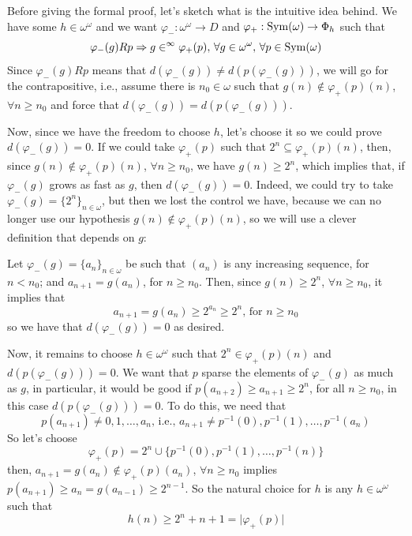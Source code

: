 \begin{sketch}
    Before giving the formal proof, let's sketch what is the intuitive idea behind. We have some $h\in\omega^\omega$ and we want $\varphi_-:\omega^\omega\to D$ and $\varphi_+:\mathrm{Sym}(\omega)\to\Phi_h$ such that
    $$\varphi_-(g)R p\Rightarrow g\in^\infty\varphi_+(p),\,\forall g\in\omega^\omega,\,\forall p\in\mathrm{Sym}(\omega)$$
    Since $\varphi_-(g)Rp$ means that $d(\varphi_-(g))\neq d(p(\varphi_-(g)))$, we will go for the contrapositive, i.e., assume there is $n_0\in\omega$ such that $g(n)\notin\varphi_+(p)(n)$, $\forall n\geq n_0$ and force that $d(\varphi_-(g))=d(p(\varphi_-(g)))$.

    Now, since we have the freedom to choose $h$, let's choose it so we could prove $d(\varphi_-(g))=0$. If we could take $\varphi_+(p)$ such that $2^n\subseteq\varphi_+(p)(n)$, then, since $g(n)\notin\varphi_+(p)(n)$, $\forall n\geq n_0$, we have $g(n)\geq 2^n$, which implies that, if $\varphi_-(g)$ grows as fast as $g$, then $d(\varphi_-(g))=0$. Indeed, we could try to take $\varphi_-(g)=\{2^n\}_{n\in\omega}$, but then we lost the control we have, because we can no longer use our hypothesis $g(n)\notin\varphi_+(p)(n)$, so we will use a clever definition that depends on $g$:
    
    Let $\varphi_-(g)=\{a_n\}_{n\in\omega}$ be such that $(a_n)$ is any increasing sequence, for $n<n_0$; and $a_{n+1}=g(a_n)$, for $n\geq n_0$. Then, since $g(n)\geq 2^n$, $\forall n\geq n_0$, it implies that
    $$a_{n+1}=g(a_n)\geq2^{a_n}\geq2^n\text{, for }n\geq n_0$$
    so we have that $d(\varphi_-(g))=0$ as desired.
    
    Now, it remains to choose $h\in\omega^\omega$ such that $2^n\in\varphi_+(p)(n)$ and $d(p(\varphi_-(g)))=0$. We want that $p$ sparse the elements of $\varphi_-(g)$ as much as $g$, in particular, it would be good if $p(a_{n+2})\geq a_{n+1}\geq2^n$, for all $n\geq n_0$, in this case $d(p(\varphi_-(g)))=0$. To do this, we need that 
    $$p(a_{n+1})\neq 0,1,\dots,a_n\text{, i.e., }a_{n+1}\neq p^{-1}(0),p^{-1}(1),\dots,p^{-1}(a_n)$$
    So let's choose
    $$\varphi_+(p)=2^n\cup\{p^{-1}(0),p^{-1}(1),\dots,p^{-1}(n)\}$$
    then, $a_{n+1}=g(a_n)\notin\varphi_+(p)(a_n)$, $\forall n\geq n_0$ implies $p(a_{n+1})\geq a_n=g(a_{n-1})\geq2^{n-1}$. So the natural choice for $h$ is any $h\in\omega^\omega$ such that
    \begin{equation}\label{eq:slalom}
        h(n)\geq2^n+n+1=\lvert\varphi_+(p)\rvert
    \end{equation}
\end{sketch}

